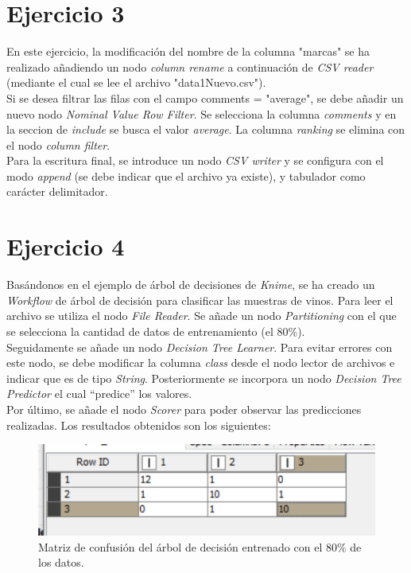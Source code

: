 \documentclass[10pt,a4paper]{article}
\begin{document}
\section{Ejercicio 3}

En este ejercicio, la modificación del nombre de la columna "marcas" se ha realizado añadiendo un nodo \textit{column rename} a continuación de \textit{CSV reader} (mediante el cual se lee el archivo "data1Nuevo.csv"). \\
Si se desea filtrar las filas con el campo comments = "average", se debe añadir un nuevo nodo \textit{Nominal Value Row Filter}. Se selecciona la columna \textit{comments} y en la seccion de \textit{include} se busca el valor \textit{average}. La columna \textit{ranking} se elimina con el nodo \textit{column filter}.\\
Para la escritura final, se introduce un nodo \textit{CSV writer} y se configura con el modo \textit{append} (se debe indicar que el archivo ya existe), y tabulador como carácter delimitador.

\newpage
\section{Ejercicio 4}

Basándonos en el ejemplo de árbol de decisiones de \textit{Knime}, se ha creado un \textit{Workflow} de árbol de decisión para clasificar las muestras de vinos. 
Para leer el archivo se utiliza el nodo \textit{File Reader}. Se añade un nodo \textit{Partitioning} con el que se selecciona la cantidad de datos de entrenamiento (el 80\%{}).\\
Seguidamente se añade un nodo \textit{Decision Tree Learner}. Para evitar errores con este nodo, se debe modificar la columna \textit{class} desde el nodo lector de archivos e indicar que es de tipo \textit{String}. Posteriormente se incorpora un nodo \textit{Decision Tree Predictor} el cual ``predice'' los valores.\\
Por último, se añade el nodo \textit{Scorer} para poder observar las predicciones realizadas. Los resultados obtenidos son los siguientes:
\begin{figure}[h!]
	\centering
	\includegraphics[scale=0.7]{images/prediction.png}
	\caption{Matriz de confusión del árbol de decisión entrenado con el 80\%{} de los datos.}
	\label{fig:prediction} 
\end{figure}
\end{document}
